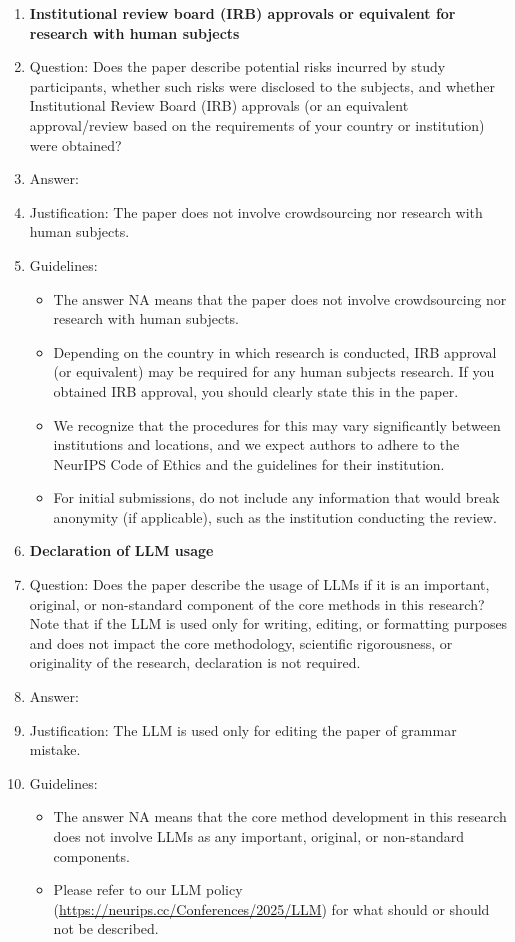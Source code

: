 \documentclass{article}
\theoremstyle{definition}
\begin{document}
\begin{enumerate}
\item {\bf Institutional review board (IRB) approvals or equivalent for research with human subjects}
    \item[] Question: Does the paper describe potential risks incurred by study participants, whether such risks were disclosed to the subjects, and whether Institutional Review Board (IRB) approvals (or an equivalent approval/review based on the requirements of your country or institution) were obtained?
    \item[] Answer: \answerNA{} %
    \item[] Justification: The paper does not involve crowdsourcing nor research with human subjects.
    \item[] Guidelines:
    \begin{itemize}
        \item The answer NA means that the paper does not involve crowdsourcing nor research with human subjects.
        \item Depending on the country in which research is conducted, IRB approval (or equivalent) may be required for any human subjects research. If you obtained IRB approval, you should clearly state this in the paper. 
        \item We recognize that the procedures for this may vary significantly between institutions and locations, and we expect authors to adhere to the NeurIPS Code of Ethics and the guidelines for their institution. 
        \item For initial submissions, do not include any information that would break anonymity (if applicable), such as the institution conducting the review.
    \end{itemize}

\item {\bf Declaration of LLM usage}
    \item[] Question: Does the paper describe the usage of LLMs if it is an important, original, or non-standard component of the core methods in this research? Note that if the LLM is used only for writing, editing, or formatting purposes and does not impact the core methodology, scientific rigorousness, or originality of the research, declaration is not required.
    \item[] Answer: \answerNo{} %
    \item[] Justification: The LLM is used only for editing the paper of grammar mistake.
    \item[] Guidelines:
    \begin{itemize}
        \item The answer NA means that the core method development in this research does not involve LLMs as any important, original, or non-standard components.
        \item Please refer to our LLM policy (\url{https://neurips.cc/Conferences/2025/LLM}) for what should or should not be described.
    \end{itemize}

\end{enumerate}
\end{document}
